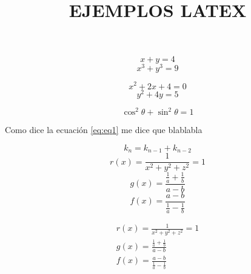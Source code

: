 \documentclass{article}
\title{EJEMPLOS LATEX}
\begin{document}
\maketitle  %

    \begin{equation}
       x+y=4
    \end{equation}
    \begin{equation}
      x^3+y^3=9
    \end{equation}

    \begin{equation}
      x^2+2x+4=0
    \end{equation}
    \begin{equation}
      y^2+4y=5  
    \end{equation}   
\newline

    \begin{equation}
        \label{eq:eq1}
        \cos^2\theta+\sin^2\theta=1
    \end{equation}

Como dice la ecuación \ref{eq:eq1} me dice que blablabla

    \begin{equation}
        \label{eq:eq2}
        k_n=k_{n-1}+k_{n-2}
    \end{equation}
\newline
    \begin{equation}
        r(x)=\frac{1}{x^2+y^2+z^2}=1
    \end{equation}
    \begin{equation}
        g(x)=\frac{\frac{1}{a}+\frac{1}{b}}{a-b}
    \end{equation}
    \begin{equation}
        f(x)=\frac{a-b}{\frac{1}{a}-\frac{1}{b}}
    \end{equation}

\begin{align}
     r(x)=\frac{1}{x^2+y^2+z^2}=1 \\
     g(x)=\frac{\frac{1}{a}+\frac{1}{b}}{a-b} \\
     f(x)=\frac{a-b}{\frac{1}{a}-\frac{1}{b}} \\
\end{align}
\end{document}
